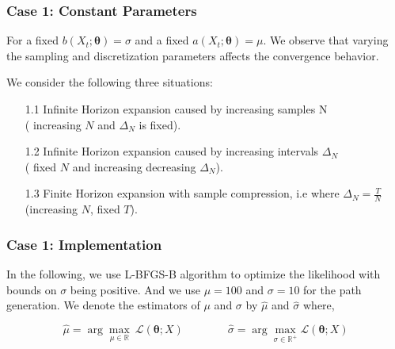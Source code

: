\documentclass[aspectratio=169]{beamer}\usepackage[utf8]{inputenc}
\newcommand{\R}{\mathbb{R}}
\begin{document}
\begin{frame}\frametitle{ Case 1: Constant Parameters }
For a fixed $b(X_t; \bm{\theta})=\sigma$ and a fixed $a(X_t; \bm{\theta})=\mu$. We observe that varying the sampling and discretization parameters affects the convergence behavior.


We consider the following three situations:
\begin{enumerate}
\item[1.1] Infinite Horizon expansion caused by increasing samples N\\ ( increasing $N$ and $\Delta_N$ is fixed).
\item[1.2] Infinite Horizon expansion caused by increasing intervals $\Delta_N$ \\ ( fixed $N$ and increasing decreasing $\Delta_N$).
\item[1.3] Finite Horizon expansion with sample compression, i.e where $\Delta_N=\frac{T}{N}$ \\ (increasing $N$, fixed $T$).
\end{enumerate}
\end{frame}


\begin{frame}\frametitle{ Case 1: Implementation }

In the following, we use  L-BFGS-B algorithm to optimize the likelihood with bounds on $\sigma$ being positive. And we use $\mu=100$ and $\sigma=10$ for the path generation. We denote the estimators of $\mu$ and $\sigma$ by  $\hat{\mu}$ and $\hat{\sigma}$ where,

\begin{equation}
 \hat{\mu} = \arg \underset{\mu \in \R}{\max} \ \mathcal{L}(\bm{\theta};X) \quad \quad  \quad \quad \hat{\sigma} = \arg \underset{\sigma \in \R^+}{\max} \mathcal{L}(\bm{\theta};X)
\end{equation}

\end{frame}
\end{document}
